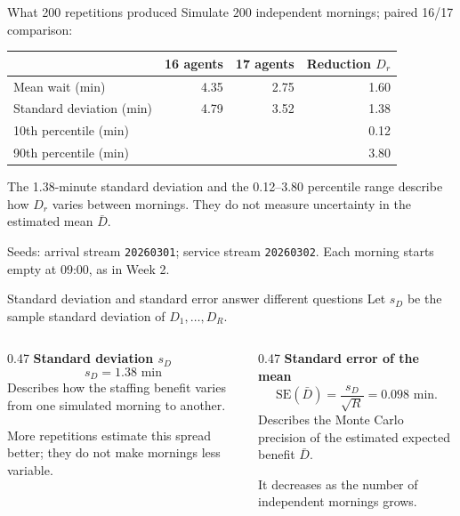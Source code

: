 \documentclass{beamer}
\begin{document}
\begin{frame}{What 200 repetitions produced}
  \footnotesize
  Simulate $200$ independent mornings; paired 16/17 comparison:
  \vspace{0.5em}

  \centering
  \setlength{\tabcolsep}{4pt}
  \begin{tabular}{@{}p{4.45cm}rrr@{}}
    \toprule
      & 16 agents & 17 agents & Reduction $D_r$\\
    \midrule
    Mean wait (min) & 4.35 & 2.75 & 1.60\\
    Standard deviation (min) & 4.79 & 3.52 & 1.38\\
    10th percentile (min) & & & 0.12\\
    90th percentile (min) & & & 3.80\\
    \bottomrule
  \end{tabular}

  \raggedright
  \vspace{0.8em}
  The 1.38-minute standard deviation and the 0.12--3.80 percentile range
  describe how $D_r$ varies between mornings. They do not measure uncertainty
  in the estimated mean $\bar D$.

  \scriptsize Seeds: arrival stream \texttt{20260301}; service stream \texttt{20260302}. Each morning starts empty at 09:00, as in Week 2.
\end{frame}

\begin{frame}{Standard deviation and standard error answer different questions}
  \small
  Let $s_D$ be the sample standard deviation of $D_1,\ldots,D_R$.

  \vspace{0.5em}
  \begin{columns}[T,onlytextwidth]
    \begin{column}{0.47\textwidth}
      \textbf{Standard deviation $s_D$}
      \[
        s_D=1.38\text{ min}
      \]
      Describes how the staffing benefit varies from one simulated morning to another.

      More repetitions estimate this spread better; they do not make mornings less variable.
    \end{column}
    \begin{column}{0.47\textwidth}
      \textbf{Standard error of the mean}
      \[
        \mathrm{SE}(\bar D)=\frac{s_D}{\sqrt R}
          =0.098\text{ min}.
      \]
      Describes the Monte Carlo precision of the estimated expected benefit $\bar D$.

      It decreases as the number of independent mornings grows.
    \end{column}
  \end{columns}
\end{frame}
\end{document}

